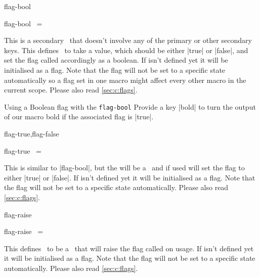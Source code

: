 \begin{function}[module=expkv-cs type]{flag-bool}
  \begin{syntax}
    flag-bool \key\ =  
  \end{syntax}
  This is a secondary \type\ that doesn't involve any of the primary or other
  secondary keys. This defines \key\ to take a value, which should be either
  |true| or |false|, and set the flag called  accordingly as a boolean.
  If  isn't defined yet it will be initialised as a flag. Note that the
  flag will not be set to a specific state automatically so a flag set in one
  macro might affect every other macro in the current scope. Please also read
  \autoref{sec:c:flags}.
\end{function}
\begin{example}{Using a Boolean flag with the \texttt{flag-bool} \type}
  Provide a key |bold| to turn the output of our macro bold if the associated
  flag is |true|.
\end{example}

\begin{function}[module=expkv-cs type]{flag-true,flag-false}
  \begin{syntax}
    flag-true \key\ =  
  \end{syntax}
  This is similar to |flag-bool|, but the  will be a \Nkey\ and if
  used will set the flag to either |true| or |false|. If  isn't defined
  yet it will be initialised as a flag. Note that the flag will not be set to a
  specific state automatically. Please also read \autoref{sec:c:flags}.
\end{function}

\begin{function}[module=expkv-cs type]{flag-raise}
  \begin{syntax}
    flag-raise \key\ =  
  \end{syntax}
  This defines \key\ to be a \Nkey\ that will raise the flag called  on
  usage. If  isn't defined yet it will be initialised as a flag. Note
  that the flag will not be set to a specific state automatically. Please also
  read \autoref{sec:c:flags}.
\end{function}


